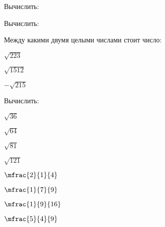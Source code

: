 \begin{class}[number=3]
\begin{listofex}
\begin{enumcols}[itemcolumns=2]
		\end{enumcols}
		\item Вычислить:
		\begin{enumcols}[itemcolumns=3]
			\item {}
			\item {}
			\item {}
			\item {}
			\item {}
			\item {}
		\end{enumcols}
		\item Вычислить:
		\begin{enumcols}[itemcolumns=3]
			\item {}
			\item {}
			\item {}
			\item {}
			\item {}
			\item {}
			\item {}
		\end{enumcols}
		\item Между какими двумя целыми числами стоит число:
		\begin{enumcols}[itemcolumns=3]
			\item \( \sqrt{223} \)
			\item \( \sqrt{1512} \)
			\item \( -\sqrt{215} \)
		\end{enumcols}
	\end{listofex}
\end{class}
%
%
\begin{homework}[number=1]
	\begin{listofex}
		\item Вычислить:
		\begin{enumcols}[itemcolumns=4]
				\item \( \sqrt{36} \)
				\item \( \sqrt{64} \)
				\item \( \sqrt{81} \)
				\item \( \sqrt{121} \)
				\item \( \mfrac{2}{1}{4} \)
				\item \( \mfrac{1}{7}{9} \)
				\item \( \mfrac{1}{9}{16} \)
				\item \( \mfrac{5}{4}{9} \)
		\end{enumcols}
	\end{listofex}
\end{homework}

